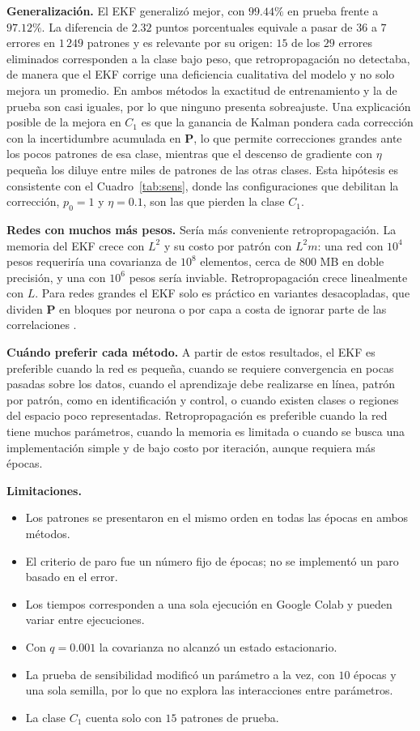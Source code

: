 \documentclass[conference]{IEEEtran}
\begin{document}
\textbf{Generalización.} El EKF generalizó mejor, con $99.44\%$ en prueba
frente a $97.12\%$. La diferencia de $2.32$ puntos porcentuales equivale a
pasar de $36$ a $7$ errores en $1\,249$ patrones y es relevante por su
origen: $15$ de los $29$ errores eliminados corresponden a la clase bajo
peso, que retropropagación no detectaba, de manera que el EKF corrige una
deficiencia cualitativa del modelo y no solo mejora un promedio. En ambos
métodos la exactitud de entrenamiento y la de prueba son casi iguales, por
lo que ninguno presenta sobreajuste. Una explicación posible de la mejora
en $C_1$ es que la ganancia de Kalman pondera cada corrección con la
incertidumbre acumulada en $\mathbf{P}$, lo que permite correcciones
grandes ante los pocos patrones de esa clase, mientras que el descenso de
gradiente con $\eta$ pequeña los diluye entre miles de patrones de las
otras clases. Esta hipótesis es consistente con el
Cuadro~\ref{tab:sens}, donde las configuraciones que debilitan la
corrección, $p_0=1$ y $\eta=0.1$, son las que pierden la clase $C_1$.

\textbf{Redes con muchos más pesos.} Sería más conveniente
retropropagación. La memoria del EKF crece con $L^2$ y su costo por patrón
con $L^2m$: una red con $10^4$ pesos requeriría una covarianza de $10^8$
elementos, cerca de $800$ MB en doble precisión, y una con $10^6$ pesos
sería inviable. Retropropagación crece linealmente con $L$. Para redes
grandes el EKF solo es práctico en variantes desacopladas, que dividen
$\mathbf{P}$ en bloques por neurona o por capa a costa de ignorar parte de
las correlaciones \cite{b5}.

\textbf{Cuándo preferir cada método.} A partir de estos resultados, el EKF
es preferible cuando la red es pequeña, cuando se requiere convergencia en
pocas pasadas sobre los datos, cuando el aprendizaje debe realizarse en
línea, patrón por patrón, como en identificación y control, o cuando
existen clases o regiones del espacio poco representadas. Retropropagación
es preferible cuando la red tiene muchos parámetros, cuando la memoria es
limitada o cuando se busca una implementación simple y de bajo costo por
iteración, aunque requiera más épocas.

\textbf{Limitaciones.}
\begin{itemize}
    \item Los patrones se presentaron en el mismo orden en todas las épocas
    en ambos métodos.
    \item El criterio de paro fue un número fijo de épocas; no se
    implementó un paro basado en el error.
    \item Los tiempos corresponden a una sola ejecución en Google Colab y
    pueden variar entre ejecuciones.
    \item Con $q=0.001$ la covarianza no alcanzó un estado estacionario.
    \item La prueba de sensibilidad modificó un parámetro a la vez, con
    $10$ épocas y una sola semilla, por lo que no explora las interacciones
    entre parámetros.
    \item La clase $C_1$ cuenta solo con $15$ patrones de prueba.
\end{itemize}
\end{document}
